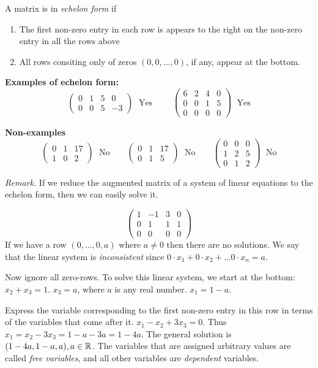 \documentclass[10pt]{scrartcl}
\begin{document}
\begin{definition}
A matrix is in \emph{echelon form} if 
\begin{enumerate}
\item The first non-zero entry in each row is appears to the right on the non-zero entry in all the rows above
\item All rows consiting only of zeros $(0,0,\dots,0)$, if any, appear at the bottom. 	
\end{enumerate}
\end{definition}

\textbf{Examples of echelon form:} 
\[
  \begin{pmatrix}
  0 & 1 & 5 & 0\\
  0 & 0 & 5 & -3	
  \end{pmatrix}
  \; \text{ Yes } 
  \qquad 
  \begin{pmatrix}
  6 & 2 & 4 & 0\\
  0 & 0 & 1 & 5\\
  0 & 0 & 0 & 0	
  \end{pmatrix}
  \; \text{ Yes}
\]

\textbf{Non-examples}
\[
  \begin{pmatrix}
  0 & 1 & 17\\
  1 & 0 & 2	
  \end{pmatrix}
 \; \text{ No} 
 \qquad 
 \begin{pmatrix}
 0 & 1 & 17\\
 0 & 1 & 5	
 \end{pmatrix}
 \; \text{ No} \qquad
 \begin{pmatrix}
 0 & 0 & 0\\
 1 & 2 & 5\\
 0 & 1 & 2	
 \end{pmatrix}\; \text{ No} 
\]

\emph{Remark.} If we reduce the augmented matrix of a system of linear equations to the echelon form, then we can easily solve it.\\

\begin{example}
\[
  \begin{pmatrix}
  1 & -1 & 3 & 0\\
  0 & 1 & 1 & 1\\
  0 & 0 & 0 & 0	
  \end{pmatrix}
\]
If we have a row $(0,\dots,0,a)$ where $a \neq 0$ then there are no solutions. We say that the linear system is \emph{inconsistent} since $0\cdot x_1 + 0 \cdot x_2 + \dots 0\cdot x_n = a$. 

Now ignore all zero-rows. To solve this linear system, we start at the bottom: $x_2 + x_3 = 1$. $x_3 =a$, where $a$ is any real number. $x_1 = 1-a$. 

Express the variable corresponding to the first non-zero entry in this row in terms of the variables that come after it. $x_1 - x_2 + 3x_3 = 0$. Thus $x_1 = x_2 - 3x_3= 1-a - 3a = 1-4a$. The general solution is $(1-4a,1-a,a),a \in\mathbb{R}$. The variables that are assigned arbitrary values are called \emph{free variables}, and all other variables are \emph{dependent} variables. 
\end{example}\vspace*{5pt}
\end{document}
